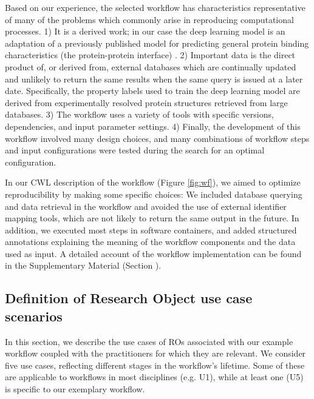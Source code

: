 
Based on our experience, the selected workflow has characteristics representative of many of the problems which commonly arise in reproducing computational processes. 1) It is a derived work; in our case the deep learning model is an adaptation of a previously published model for predicting general protein binding characteristics (the protein-protein interface) \cite{capelMultitaskLearningLeverage2022}. 2) Important data is the direct product of, or derived from, external databases which are continually updated and unlikely to return the same results when the same query is issued at a later date. Specifically, the property labels used to train the deep learning model are derived from experimentally resolved protein structures retrieved from large databases. 3) The workflow uses a variety of tools with specific versions, dependencies, and input parameter settings. 4) Finally, the development of this workflow involved many design choices, and many combinations of workflow steps and input configurations were tested during the search for an optimal configuration.

In our CWL description of the workflow (Figure \ref{fig:wf}), we aimed to optimize reproducibility by making some specific choices: We included database querying and data retrieval in the workflow and avoided the use of external identifier mapping tools, which are not likely to return the same output in the future. In addition, we executed most steps in software containers, and added structured annotations explaining the meaning of the workflow components and the data used as input. A detailed account of the workflow implementation can be found in the Supplementary Material (Section \emph{}). 

\subsection{Definition of Research Object use case scenarios}
\label{sec:stakeholders}

In this section, we describe the use cases of ROs associated with our example workflow coupled with the practitioners for which they are relevant. We consider five use cases, reflecting different stages in the workflow's lifetime. Some of these are applicable to workflows in most disciplines (e.g. U1), while at least one (U5) is specific to our exemplary workflow.

